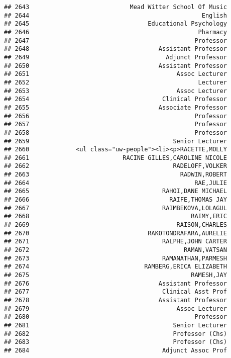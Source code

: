 \documentclass[
]{article}
\begin{document}
\begin{verbatim}
## 2643                            Mead Witter School Of Music
## 2644                                                English
## 2645                                 Educational Psychology
## 2646                                               Pharmacy
## 2647                                              Professor
## 2648                                    Assistant Professor
## 2649                                      Adjunct Professor
## 2650                                    Assistant Professor
## 2651                                         Assoc Lecturer
## 2652                                               Lecturer
## 2653                                         Assoc Lecturer
## 2654                                     Clinical Professor
## 2655                                    Associate Professor
## 2656                                              Professor
## 2657                                              Professor
## 2658                                              Professor
## 2659                                        Senior Lecturer
## 2660             <ul class="uw-people"><li><p>RACETTE,MOLLY
## 2661                          RACINE GILLES,CAROLINE NICOLE
## 2662                                        RADELOFF,VOLKER
## 2663                                          RADWIN,ROBERT
## 2664                                              RAE,JULIE
## 2665                                     RAHOI,DANE MICHAEL
## 2666                                       RAIFE,THOMAS JAY
## 2667                                     RAIMBEKOVA,LOLAGUL
## 2668                                             RAIMY,ERIC
## 2669                                         RAISON,CHARLES
## 2670                                 RAKOTONDRAFARA,AURELIE
## 2671                                     RALPHE,JOHN CARTER
## 2672                                           RAMAN,VATSAN
## 2673                                     RAMANATHAN,PARMESH
## 2674                                RAMBERG,ERICA ELIZABETH
## 2675                                             RAMESH,JAY
## 2676                                    Assistant Professor
## 2677                                     Clinical Asst Prof
## 2678                                    Assistant Professor
## 2679                                         Assoc Lecturer
## 2680                                              Professor
## 2681                                        Senior Lecturer
## 2682                                        Professor (Chs)
## 2683                                        Professor (Chs)
## 2684                                     Adjunct Assoc Prof

\end{verbatim}
\end{document}
